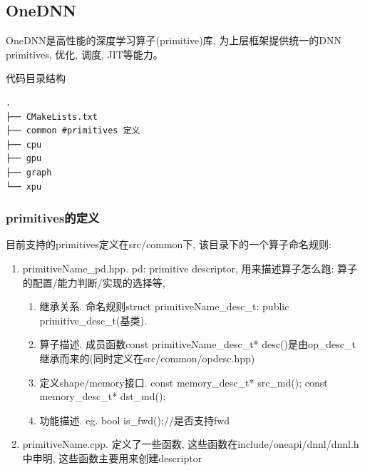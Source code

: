 \subsection{OneDNN}
OneDNN是高性能的深度学习算子(primitive)库, 为上层框架提供统一的DNN primitives, 优化, 调度, JIT等能力。


代码目录结构
\begin{lstlisting}
.
├── CMakeLists.txt
├── common #primitives 定义
├── cpu
├── gpu
├── graph
└── xpu
\end{lstlisting}

\subsubsection{primitives的定义}
目前支持的primitives定义在src/common下, 该目录下的一个算子命名规则:
\begin{enumerate}
    \item primitiveName\_pd.hpp. pd: primitive descriptor, 用来描述算子怎么跑: 算子的配置/能力判断/实现的选择等, 
	  \begin{enumerate}
	    \item 继承关系. 命名规则struct primitiveName\_desc\_t: public primitive\_desc\_t(基类).
	    \item 算子描述. 成员函数const primitiveName\_desc\_t* desc()是由op\_desc\_t继承而来的(同时定义在src/common/opdesc.hpp)
	    \item 定义shape/memory接口. const memory\_desc\_t* src\_md(); const memory\_desc\_t* dst\_md();
	    \item 功能描述. eg. bool is\_fwd();//是否支持fwd
	  \end{enumerate}
    \item primitiveName.cpp. 定义了一些函数, 这些函数在include/oneapi/dnnl/dnnl.h中申明, 这些函数主要用来创建descriptor
\end{enumerate}

